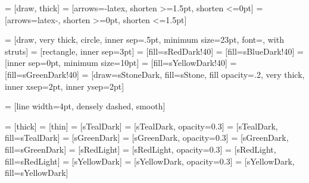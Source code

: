  = [draw, thick]
 = [arrows={-latex}, shorten >=1.5pt, shorten <=0pt]
 = [arrows={latex-}, shorten >=0pt, shorten <=1.5pt]

 = [draw, very thick, circle, inner sep=.5pt, minimum size=23pt, font=\small, with struts]
 = [rectangle, inner sep=3pt]
 = [fill=sRedDark!40]
 = [fill=sBlueDark!40]
 = [inner sep=0pt, minimum size=10pt]
 = [fill=sYellowDark!40]
 = [fill=sGreenDark!40]
 = [draw=sStoneDark, fill=sStone, fill opacity=.2, very thick, inner xsep=2pt, inner ysep=2pt]




 = [line width=4pt, densely dashed, smooth]

 = [thick]
 = [thin]
 = [sTealDark]
 = [sTealDark, opacity=0.3]
 = [sTealDark, fill=sTealDark]
 = [sGreenDark]
 = [sGreenDark, opacity=0.3]
 = [sGreenDark, fill=sGreenDark]
 = [sRedLight]
 = [sRedLight, opacity=0.3]
 = [sRedLight, fill=sRedLight]
 = [sYellowDark]
 = [sYellowDark, opacity=0.3]
 = [sYellowDark, fill=sYellowDark]

